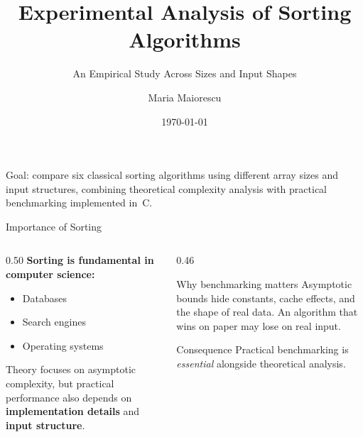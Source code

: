 \documentclass[aspectratio=169]{beamer}
\title[Sorting Algorithms]{Experimental Analysis of Sorting Algorithms}
\subtitle{An Empirical Study Across Sizes and Input Shapes}
\author{Maria Maiorescu}
\institute[UVT]{%
  Faculty of Informatics\\
  West University of Timi\c{s}oara
}
\date{\today}
\begin{document}
\begin{frame}
  \titlepage
  \vspace{-0.5em}
  \begin{center}
    \small
    Goal: compare six classical sorting algorithms using different array sizes
    and input structures, combining theoretical complexity analysis with practical
    benchmarking implemented in~C.
  \end{center}
\end{frame}

\begin{frame}{Importance of Sorting}
  \begin{columns}[T]
    \begin{column}{0.50\textwidth}
      \textbf{Sorting is fundamental in computer science:}
      \begin{itemize}
        \item Databases
        \item Search engines
        \item Operating systems
      \end{itemize}
      \vspace{0.7em}
      Theory focuses on asymptotic complexity, but practical performance also
      depends on \textbf{implementation details} and \textbf{input structure}.
    \end{column}
    \begin{column}{0.46\textwidth}
      \begin{alertblock}{Why benchmarking matters}
        Asymptotic bounds hide constants, cache effects, and the shape of real
        data.  An algorithm that wins on paper may lose on real input.
      \end{alertblock}
      \vspace{0.5em}
      \begin{block}{Consequence}
        Practical benchmarking is \emph{essential} alongside theoretical analysis.
      \end{block}
    \end{column}
  \end{columns}
\end{frame}
\end{document}

